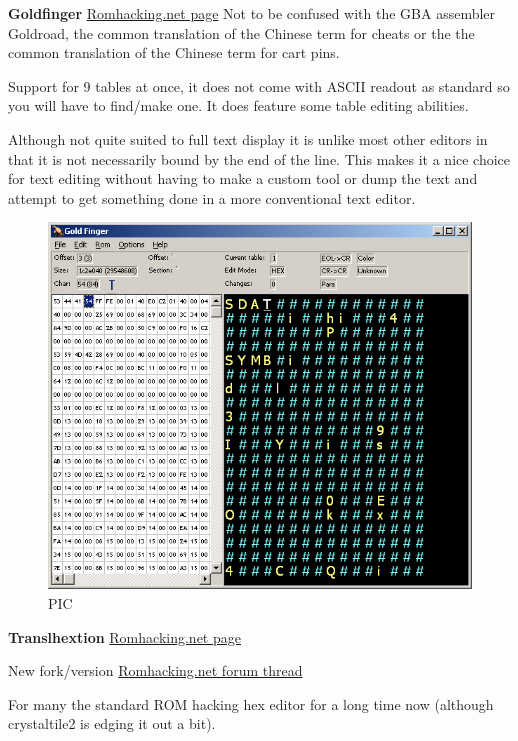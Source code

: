 \documentclass[
]{book}
\begin{document}
\textbf{Goldfinger} \href{http://www.romhacking.net/utilities/204/}{Romhacking.net page} Not to be confused with the GBA assembler Goldroad, the common translation of the Chinese term for cheats or the the common translation of the Chinese term for cart pins.

Support for 9 tables at once, it does not come with ASCII readout as standard so you will have to find/make one. It does feature some table editing abilities.

Although not quite suited to full text display it is unlike most other editors in that it is not necessarily bound by the end of the line. This makes it a nice choice for text editing without having to make a custom tool or dump the text and attempt to get something done in a more conventional text editor.

\begin{figure}
\centering
\includegraphics{images/10_home_fast6191_romhackingguide_unrenamed_file___omhackingguidehexeditorsshowcasegoldfinger1.png}
\caption{PIC}
\end{figure}

\textbf{Translhextion} \href{http://www.romhacking.net/utilities/219/\%20}{Romhacking.net page}

New fork/version \href{http://www.romhacking.net/forum/topic,14373.0.html}{Romhacking.net forum thread}

For many the standard ROM hacking hex editor for a long time now (although crystaltile2 is edging it out a bit).
\end{document}
